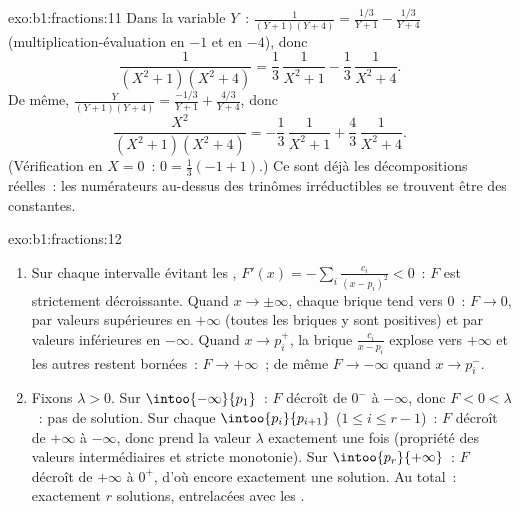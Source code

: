 \begin{solution}{exo:b1:fractions:11}
Dans la variable $Y$~: $\frac1{(Y+1)(Y+4)} = \frac{1/3}{Y+1} -
\frac{1/3}{Y+4}$ (multiplication-évaluation en $-1$ et en $-4$), donc
\[
\frac{1}{(X^2+1)(X^2+4)}
= \frac13\,\frac1{X^2+1} - \frac13\,\frac1{X^2+4} .
\]
De même, $\frac{Y}{(Y+1)(Y+4)} = \frac{-1/3}{Y+1} +
\frac{4/3}{Y+4}$, donc
\[
\frac{X^2}{(X^2+1)(X^2+4)}
= -\frac13\,\frac1{X^2+1} + \frac43\,\frac1{X^2+4} .
\]
(Vérification en $X = 0$~: $0 = \frac13(-1 + 1)$.) Ce sont déjà les
décompositions réelles~: les numérateurs au-dessus des trinômes
irréductibles se trouvent être des constantes.
\end{solution}

\begin{solution}{exo:b1:fractions:12}
\begin{enumerate}
  \item Sur chaque intervalle évitant les , $F'(x) = -\sum_i
        \frac{c_i}{(x - p_i)^2} < 0$~: $F$ est strictement décroissante.
        Quand $x \to \pm\infty$, chaque brique tend vers $0$~: $F \to
        0$, par valeurs supérieures en $+\infty$ (toutes les briques y
        sont positives) et par valeurs inférieures en $-\infty$. Quand
        $x \to p_i^+$, la brique $\frac{c_i}{x - p_i}$ explose vers
        $+\infty$ et les autres restent bornées~: $F \to +\infty$~; de
        même $F \to -\infty$ quand $x \to p_i^-$.
  \item Fixons $\lambda > 0$. Sur $\intoo{-\infty}{p_1}$~: $F$ décroît
        de $0^-$ à $-\infty$, donc $F < 0 < \lambda$~: pas de solution.
        Sur chaque $\intoo{p_i}{p_{i+1}}$ ($1 \leq i \leq r-1$)~: $F$
        décroît de $+\infty$ à $-\infty$, donc prend la valeur $\lambda$
        exactement une fois (propriété des valeurs intermédiaires et
        stricte monotonie). Sur $\intoo{p_r}{+\infty}$~: $F$ décroît de
        $+\infty$ à $0^+$, d'où encore exactement une solution. Au
        total~: exactement $r$ solutions, entrelacées avec les .
\end{enumerate}
\end{solution}

